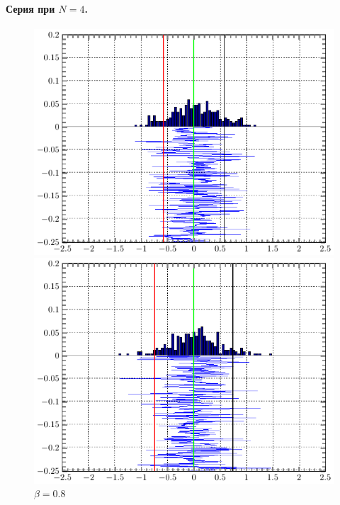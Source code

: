 \documentclass[a4paper,14pt]{extarticle}
\begin{document}
\paragraph{Серия при $N=4$.} \hphantom{asasfsd}
\begin{figure}[H]
\begin{minipage}{0.3\linewidth}
    \centering
    \includegraphics[width=\linewidth]{fig/gist_n4_b80.pdf}
    \vspace{-1em}
    \caption{$\beta =0.8$}
\end{minipage}
\begin{minipage}{0.3\linewidth}
    \centering
    \includegraphics[width=\linewidth]{fig/gist_n4_b95.pdf}
    \vspace{-1em}

\end{minipage}
\end{figure}
\end{document}
